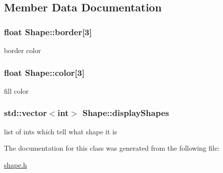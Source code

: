 \subsection{Member Data Documentation}
\hypertarget{classShape_ac4439415a7e663a7088fe36244cefaca}{
\subsubsection[{border}]{\setlength{\rightskip}{0pt plus 5cm}float Shape\-::border\mbox{[}3\mbox{]}}}\label{classShape_ac4439415a7e663a7088fe36244cefaca}
border color \hypertarget{classShape_a9f925188936af909e796807fc75c1501}{
\subsubsection[{color}]{\setlength{\rightskip}{0pt plus 5cm}float Shape\-::color\mbox{[}3\mbox{]}}}\label{classShape_a9f925188936af909e796807fc75c1501}
fill color \hypertarget{classShape_affa8864633ce066ea626eb50fb4d7584}{
\subsubsection[{display\-Shapes}]{\setlength{\rightskip}{0pt plus 5cm}std\-::vector$<$int$>$ Shape\-::display\-Shapes}}\label{classShape_affa8864633ce066ea626eb50fb4d7584}
list of ints which tell what shape it is 

The documentation for this class was generated from the following file\-:\begin{DoxyCompactItemize}
\item 
\hyperlink{shape_8h}{shape.\-h}\end{DoxyCompactItemize}
